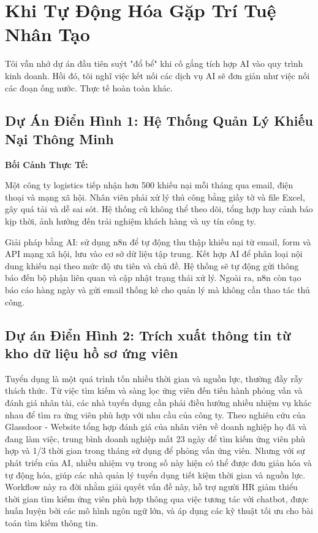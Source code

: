 \section{Khi Tự Động Hóa Gặp Trí Tuệ Nhân Tạo}
Tôi vẫn nhớ dự án đầu tiên suýt "đổ bể" khi cố gắng tích hợp AI vào quy trình kinh doanh. Hồi đó, tôi nghĩ việc kết nối các dịch vụ AI sẽ đơn giản như việc nối các đoạn ống nước. Thực tế hoàn toàn khác.


\subsection{Dự Án Điển Hình 1: Hệ Thống Quản Lý Khiếu Nại Thông Minh}
\textbf{Bối Cảnh Thực Tế:}

Một công ty logistics tiếp nhận hơn 500 khiếu nại mỗi tháng qua email, điện thoại và mạng xã hội. Nhân viên phải xử lý thủ công bằng giấy tờ và file Excel, gây quá tải và dễ sai sót. Hệ thống cũ không thể theo dõi, tổng hợp hay cảnh báo kịp thời, ảnh hưởng đến trải nghiệm khách hàng và uy tín công ty.

Giải pháp bằng AI: sử dụng n8n để tự động thu thập khiếu nại từ email, form và API mạng xã hội, lưu vào cơ sở dữ liệu tập trung. Kết hợp AI để phân loại nội dung khiếu nại theo mức độ ưu tiên và chủ đề. Hệ thống sẽ tự động gửi thông báo đến bộ phận liên quan và cập nhật trạng thái xử lý. Ngoài ra, n8n còn tạo báo cáo hàng ngày và gửi email thống kê cho quản lý mà không cần thao tác thủ công.



\subsection{Dự án Điển Hình 2: Trích xuất thông tin từ kho dữ liệu hồ sơ ứng viên}



Tuyển dụng là một quá trình tốn nhiều thời gian và nguồn lực, thường đầy rẫy thách thức. Từ việc tìm kiếm và sàng lọc ứng viên đến tiến hành phỏng vấn và đánh giá nhân tài, các nhà tuyển dụng cần phải điều hướng nhiều nhiệm vụ khác nhau để tìm ra ứng viên phù hợp với nhu cầu của công ty. Theo nghiên cứu của Glassdoor - Website tổng hợp đánh giá của nhân viên về doanh nghiệp họ đã và đang làm việc, trung bình doanh nghiệp mất 23 ngày để tìm kiếm ứng viên phù hợp và 1/3 thời gian trong tháng sử dụng để phỏng vấn ứng viên. Nhưng với sự phát triển của AI, nhiều nhiệm vụ trong số này hiện có thể được đơn giản hóa và tự động hóa, giúp các nhà quản lý tuyển dụng tiết kiệm thời gian và nguồn lực. Workflow này ra đời nhằm giải quyết vấn đề này, hỗ trợ người HR giảm thiểu thời gian tìm kiếm ứng viên phù hợp thông qua việc tương tác với chatbot, được huấn luyện bởi các mô hình ngôn ngữ lớn, và áp dụng các kỹ thuật tối ưu cho bài toán tìm kiếm thông tin.













